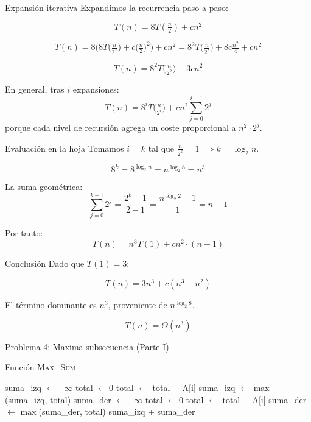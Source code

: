 \documentclass{beamer}
\begin{document}
\begin{frame}{Expansión iterativa}
Expandimos la recurrencia paso a paso:

\[
T(n) = 8T\!\left(\tfrac{n}{2}\right) + c n^2
\]

\[
T(n) = 8\Big(8T\!\big(\tfrac{n}{2^2}\big) + c\big(\tfrac{n}{2}\big)^2\Big) + c n^2
= 8^2 T\!\big(\tfrac{n}{2^2}\big) + 8c \tfrac{n^2}{4} + c n^2
\]

\[
T(n) = 8^2 T\!\big(\tfrac{n}{2^2}\big) + 3c n^2
\]

En general, tras $i$ expansiones:
\[
T(n) = 8^i T\!\big(\tfrac{n}{2^i}\big) + c n^2 \sum_{j=0}^{i-1} 2^j
\]
porque cada nivel de recursión agrega un coste proporcional a $n^2 \cdot 2^j$.
\end{frame}

\begin{frame}{Evaluación en la hoja}
Tomamos $i=k$ tal que $\tfrac{n}{2^k}=1 \implies k=\log_2 n$.

\[
8^k = 8^{\log_2 n} = n^{\log_2 8} = n^3
\]

La suma geométrica:
\[
\sum_{j=0}^{k-1} 2^j = \frac{2^k - 1}{2 - 1} = \frac{n^{\log_2 2}-1}{1} = {n - 1}
\]

Por tanto:
\[
T(n) = n^3 T(1) + c n^2 \cdot {(n - 1)}
\]
\end{frame}

\begin{frame}{Conclusión}
Dado que $T(1)=3$:

\[
T(n) = 3n^3 + {c}(n^3 - n^2)
\]

El término dominante es $n^3$, proveniente de $n^{\log_2 8}$.

\[
\boxed{T(n) = \Theta(n^3)}
\]

\bigskip

\end{frame}














\begin{frame}{Problema 4: Maxima subsecuencia (Parte I)}
\begin{algorithm}[H]
\caption{Función \textsc{Max\_Sum}}
\begin{algorithmic}[1]
  \State suma\_izq $\gets -\infty$
  \State total $\gets 0$
    \State total $\gets$ total + A[i]
    \State suma\_izq $\gets \max$(suma\_izq, total)
  \EndFor
  \State suma\_der $\gets -\infty$
  \State total $\gets 0$
    \State total $\gets$ total + A[i]
    \State suma\_der $\gets \max$(suma\_der, total)
  \EndFor
  \State \Return suma\_izq + suma\_der
\EndFunction
\end{algorithmic}
\end{algorithm}
\end{frame}
\end{document}
